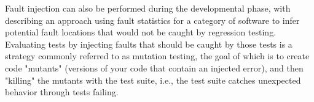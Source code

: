 Fault injection can also be performed during the developmental phase, with~\citet{natella2012fault} describing an approach using fault statistics for a category of software to infer potential fault locations that would not be caught by regression testing. Evaluating tests by injecting faults that should be caught by those tests is a strategy commonly referred to as mutation testing, the goal of which is to create code "mutants" (versions of your code that contain an injected error), and then "killing" the mutants with the test suite, i.e.,  the test suite catches unexpected behavior through tests failing.